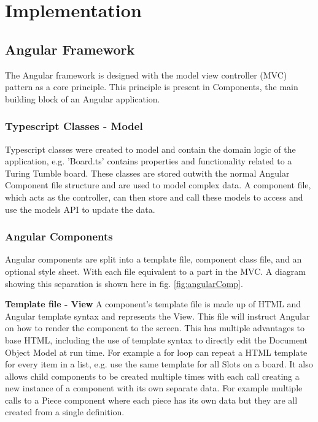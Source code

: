 \documentclass{l4proj}
\begin{document}
\chapter{Implementation}
\label{section:implementation}
\section{Angular Framework}
The Angular framework is designed with the model view controller (MVC) pattern as a core principle.  This principle is present in Components, the main building block of an Angular application. 

\subsection{Typescript Classes - Model}
Typescript classes were created to model and contain the domain logic of the application, e.g. 'Board.ts' contains properties and functionality related to a Turing Tumble board. These classes are stored outwith the normal Angular Component file structure and are used to model complex data. A component file, which acts as the controller, can then store and call these models to access and use the models API to update the data.

\subsection{Angular Components}
Angular components are split into a template file, component class file, and an optional style sheet. With each file equivalent to a part in the MVC. A diagram showing this separation is shown here in fig. \ref{fig:angularComp}. 

\textbf{Template file - View}
A component's template file is made up of HTML and Angular template syntax and represents the View. This file will instruct Angular on how to render the component to the screen. This has multiple advantages to base HTML, including the use of template syntax to directly edit the Document Object Model at run time. For example a for loop can repeat a HTML template for every item in a list, e.g. use the same template for all Slots on a board. It also allows child components to be created multiple times with each call creating a new instance of a component with its own separate data. For example multiple calls to a Piece component where each piece has its own data but they are all created from a single definition.
\end{document}
